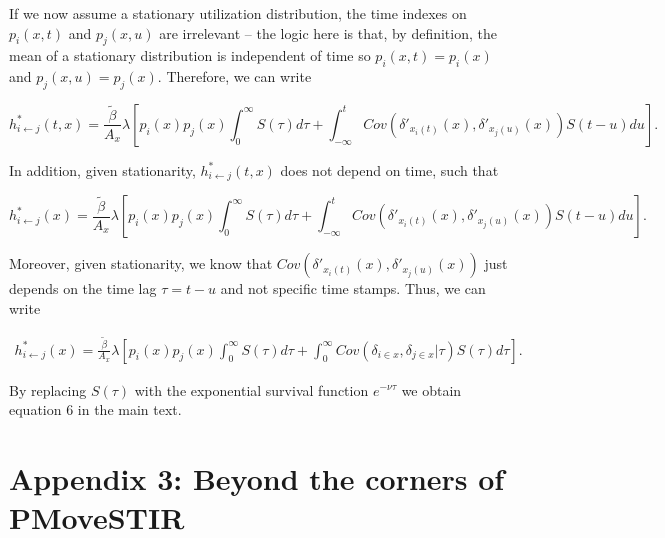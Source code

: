 \documentclass[letterpaper]{article}
\begin{document}
If we now assume a stationary utilization distribution, the time indexes on $p_i(x, t)$ and $p_j(x, u)$ are irrelevant -- the logic here is that, by definition, the mean of a stationary distribution is independent of time so $p_i(x, t) = p_i(x)$ and $p_j(x, u) = p_j(x)$. Therefore, we can write  

$$
h^*_{i \leftarrow j}(t, x) = \frac{\tilde{\beta}}{A_x} \lambda \left[p_i(x) p_j(x) \int_0^\infty S(\tau) d\tau  + \int_{-\infty}^t Cov(\delta'_{x_i(t)}(x), \delta'_{x_j(u)}(x)) S(t - u) du\right].
$$

In addition, given stationarity, $h^*_{i \leftarrow j}(t, x)$ does not depend on time, such that 

$$
h^*_{i \leftarrow j}(x) = \frac{\tilde{\beta}}{A_x} \lambda \left[p_i(x) p_j(x) \int_0^\infty S(\tau) d\tau  + \int_{-\infty}^t Cov(\delta'_{x_i(t)}(x), \delta'_{x_j(u)}(x)) S(t - u) du\right].
$$

Moreover, given stationarity, we know that $Cov(\delta'_{x_i(t)}(x), \delta'_{x_j(u)}(x))$ just depends on the time lag $\tau = t - u$ and not specific time stamps. Thus, we can write

\begin{equation}
    \begin{aligned}
   h^*_{i \leftarrow j}(x) = \frac{\tilde{\beta}}{A_x} \lambda \left[p_i(x)p_j(x) \int_0^\infty S(\tau) d\tau + \int_{0}^{\infty} Cov(\delta_{i \in x}, \delta_{j \in x} | \tau) S(\tau) d\tau\right].
    \end{aligned}
    \label{eq:foi_stationary}
\end{equation}

By replacing $S(\tau)$ with the exponential survival function $e^{-\nu \tau}$ we obtain equation 6 in the main text.

\section*{Appendix 3: Beyond the corners of PMoveSTIR}
\end{document}
